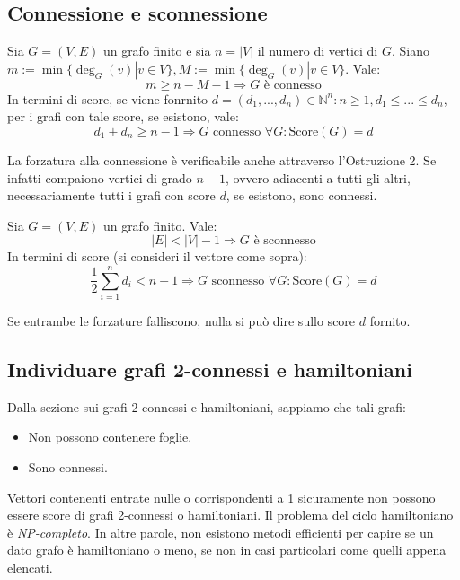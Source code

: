 \documentclass[oneside]{book}
\begin{document}
\subsection*{Connessione e sconnessione}
\begin{tcolorbox}[colback=red!30, colframe=red!30!black, title=Forzatura alla connessione]
Sia $G=(V,E)$ un grafo  finito e sia $n=|V|$ il numero
di vertici di $G$. Siano $m:=\min\{\deg_G(v)|v\in V\},
M:=\min\{\deg_G(v)|v\in V\}$. Vale:
\[ m\geq n-M-1 \Longrightarrow G \text{ è connesso} \]
In termini di score, se viene fonrnito $d=(d_1,...,d_n)\in\mathbb{N}^n:
n\geq1, d_1\leq...\leq d_n$, per i grafi con tale score, se
esistono, vale:
\[ d_1+d_n \geq n-1 \Longrightarrow G\text{ connesso }\forall G:\text{Score}(G)=d \]
\end{tcolorbox}
\begin{osservaz}
La forzatura alla connessione è verificabile
anche attraverso l'Ostruzione 2. Se infatti compaiono vertici di grado
$n-1$, ovvero adiacenti a tutti gli altri, necessariamente tutti i
grafi con score $d$, se esistono, sono connessi.
\end{osservaz}

\begin{tcolorbox}[colback=red!30, colframe=red!30!black, title=Forzatura alla sconnessione]
Sia $G=(V,E)$ un grafo finito. Vale:
\[ |E|<|V|-1 \Longrightarrow G \text{ è sconnesso} \]
In termini di score (si consideri il vettore come sopra):
\[ \frac12\sum_{i=1}^{n}d_i < n-1 \Longrightarrow G\text{ sconnesso } \forall G:\text{Score}(G)=d \]
\end{tcolorbox}
\begin{osservaz}
Se entrambe le forzature falliscono, nulla si può dire sullo score $d$ fornito.
\end{osservaz}

\subsection*{Individuare grafi 2-connessi e hamiltoniani}
\noindent Dalla sezione sui grafi 2-connessi e hamiltoniani, sappiamo che tali
grafi:
\begin{itemize}
\item Non possono contenere foglie.
\item Sono connessi.
\end{itemize}
Vettori contenenti entrate nulle o corrispondenti a 1 sicuramente
non possono essere score di grafi 2-connessi o hamiltoniani.
Il problema del ciclo hamiltoniano è \textit{NP-completo}. In altre
parole, non esistono metodi efficienti per capire se un dato grafo
è hamiltoniano o meno, se non in casi particolari come quelli appena
elencati.
\end{document}
